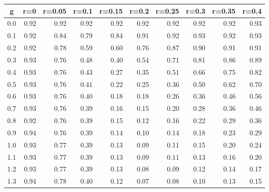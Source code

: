 %
\begin{table}[!tbp]
 \begin{center}
 \begin{tabular}{rrrrrrrrrr}\hline\hline
\multicolumn{1}{c}{g}&\multicolumn{1}{c}{r=0}&\multicolumn{1}{c}{r=0.05}&\multicolumn{1}{c}{r=0.1}&\multicolumn{1}{c}{r=0.15}&\multicolumn{1}{c}{r=0.2}&\multicolumn{1}{c}{r=0.25}&\multicolumn{1}{c}{r=0.3}&\multicolumn{1}{c}{r=0.35}&\multicolumn{1}{c}{r=0.4}\tabularnewline
\hline
0.0&0.92&0.92&0.92&0.92&0.92&0.92&0.92&0.92&0.93\tabularnewline
0.1&0.92&0.84&0.79&0.84&0.91&0.92&0.93&0.92&0.93\tabularnewline
0.2&0.92&0.78&0.59&0.60&0.76&0.87&0.90&0.91&0.91\tabularnewline
0.3&0.93&0.76&0.48&0.40&0.54&0.71&0.81&0.86&0.89\tabularnewline
0.4&0.93&0.76&0.43&0.27&0.35&0.51&0.66&0.75&0.82\tabularnewline
0.5&0.93&0.76&0.41&0.22&0.25&0.36&0.50&0.62&0.70\tabularnewline
0.6&0.93&0.76&0.40&0.18&0.18&0.26&0.36&0.46&0.56\tabularnewline
0.7&0.93&0.76&0.39&0.16&0.15&0.20&0.28&0.36&0.46\tabularnewline
0.8&0.92&0.76&0.39&0.15&0.12&0.16&0.22&0.29&0.36\tabularnewline
0.9&0.94&0.76&0.39&0.14&0.10&0.14&0.18&0.23&0.29\tabularnewline
1.0&0.93&0.77&0.39&0.13&0.09&0.11&0.15&0.20&0.24\tabularnewline
1.1&0.93&0.77&0.39&0.13&0.09&0.11&0.13&0.16&0.20\tabularnewline
1.2&0.93&0.77&0.39&0.13&0.08&0.09&0.12&0.14&0.17\tabularnewline
1.3&0.94&0.78&0.40&0.12&0.07&0.08&0.10&0.13&0.15\tabularnewline
\hline
\end{tabular}

\end{center}

\end{table}

